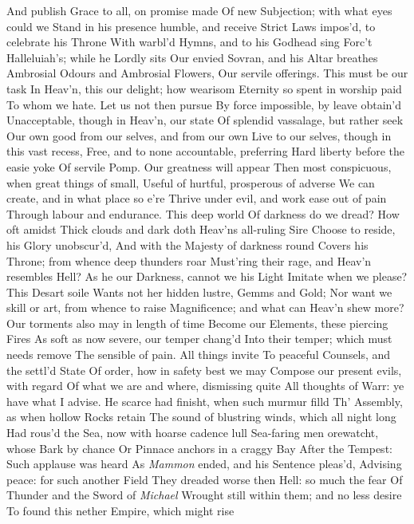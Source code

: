 \documentclass[11pt]{book}
\begin{document}
And publish Grace to all, on promise made 
Of new Subjection; with what eyes could we 
Stand in his presence humble, and receive 
Strict Laws impos'd, to celebrate his Throne 
With warbl'd Hymns, and to his Godhead sing 
Forc't Halleluiah's; while he Lordly sits 
Our envied Sovran, and his Altar breathes 
Ambrosial Odours and Ambrosial Flowers, 
Our servile offerings.  This must be our task 
In Heav'n, this our delight; how wearisom 
Eternity so spent in worship paid 
To whom we hate.  Let us not then pursue 
By force impossible, by leave obtain'd 
Unacceptable, though in Heav'n, our state 
Of splendid vassalage, but rather seek 
Our own good from our selves, and from our own 
Live to our selves, though in this vast recess, 
Free, and to none accountable, preferring 
Hard liberty before the easie yoke 
Of servile Pomp.  Our greatness will appear 
Then most conspicuous, when great things of small, 
Useful of hurtful, prosperous of adverse 
We can create, and in what place so e're 
Thrive under evil, and work ease out of pain 
Through labour and endurance.  This deep world 
Of darkness do we dread?  How oft amidst 
Thick clouds and dark doth Heav'ns all-ruling Sire 
Choose to reside, his Glory unobscur'd, 
And with the Majesty of darkness round 
Covers his Throne; from whence deep thunders roar 
Must'ring their rage, and Heav'n resembles Hell? 
As he our Darkness, cannot we his Light 
Imitate when we please?  This Desart soile 
Wants not her hidden lustre, Gemms and Gold; 
Nor want we skill or art, from whence to raise 
Magnificence; and what can Heav'n shew more? 
Our torments also may in length of time 
Become our Elements, these piercing Fires 
As soft as now severe, our temper chang'd 
Into their temper; which must needs remove 
The sensible of pain.  All things invite 
To peaceful Counsels, and the settl'd State 
Of order, how in safety best we may 
Compose our present evils, with regard 
Of what we are and where, dismissing quite 
All thoughts of Warr: ye have what I advise. 
\quad He scarce had finisht, when such murmur filld 
Th' Assembly, as when hollow Rocks retain 
The sound of blustring winds, which all night long 
Had rous'd the Sea, now with hoarse cadence lull 
Sea-faring men orewatcht, whose Bark by chance 
Or Pinnace anchors in a craggy Bay 
After the Tempest: Such applause was heard 
As \textit{Mammon} ended, and his Sentence pleas'd, 
Advising peace: for such another Field 
They dreaded worse then Hell: so much the fear 
Of Thunder and the Sword of \textit{Michael} 
Wrought still within them; and no less desire 
To found this nether Empire, which might rise 
\end{document}
